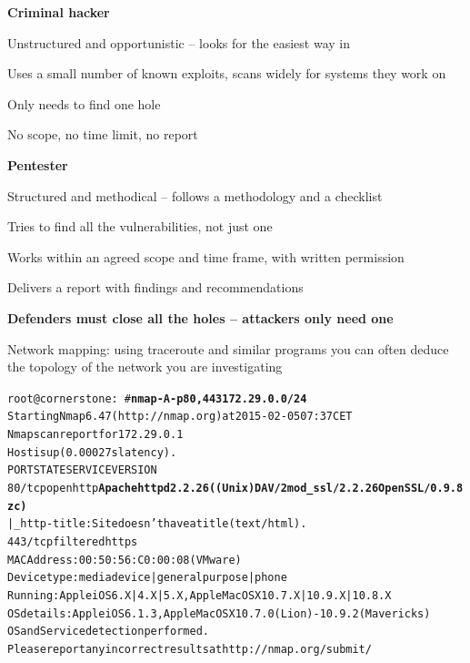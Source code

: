 \documentclass[Screen16to9,17pt]{foils}
\begin{document}

\begin{minipage}[t]{0.44\textwidth}
{\bf Criminal hacker}
\begin{list2}
\item Unstructured and opportunistic -- looks for the easiest way in
\item Uses a small number of known exploits, scans widely for systems they work on
\item Only needs to find one hole
\item No scope, no time limit, no report
\end{list2}
\end{minipage}\hfill
\begin{minipage}[t]{0.44\textwidth}
{\bf Pentester}
\begin{list2}
\item Structured and methodical -- follows a methodology and a checklist
\item Tries to find all the vulnerabilities, not just one
\item Works within an agreed scope and time frame, with written permission
\item Delivers a report with findings and recommendations
\end{list2}
\end{minipage}

\vskip 1cm
\centerline{\bf Defenders must close all the holes -- attackers only need one}




\begin{list1}
\item Network mapping: using traceroute and similar programs you can often
  deduce the topology of the network you are investigating
\end{list1}



\begin{alltt}\scriptsize
root@cornerstone:~#{\bfseries nmap -A -p80,443 172.29.0.0/24}
Starting Nmap 6.47 ( http://nmap.org ) at 2015-02-05 07:37 CET
Nmap scan report for 172.29.0.1
Host is up (0.00027s latency).
PORT    STATE    SERVICE VERSION
80/tcp  open     http    {\bf Apache httpd 2.2.26 ((Unix) DAV/2 mod_ssl/2.2.26 OpenSSL/0.9.8zc)}
|_http-title: Site doesn't have a title (text/html).
443/tcp filtered https
MAC Address: 00:50:56:C0:00:08 (VMware)
Device type: media device|general purpose|phone
Running: Apple iOS 6.X|4.X|5.X, Apple Mac OS X 10.7.X|10.9.X|10.8.X
OS details: Apple iOS 6.1.3, Apple Mac OS X 10.7.0 (Lion) - 10.9.2 (Mavericks)
OS and Service detection performed.
Please report any incorrect results at http://nmap.org/submit/
\end{alltt}
\end{document}
